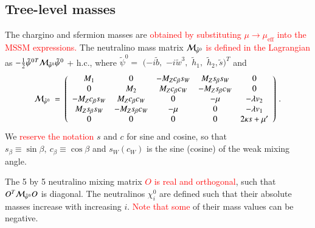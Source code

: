 \documentclass[final,3p,times,pdflatex]{elsarticle}
\newcommand{\ba}{\begin{eqnarray}}
\newcommand{\ea}{\end{eqnarray}}
\newcommand*{\red}[1]{\textcolor{red}{#1}}
\begin{document}
 

\subsection{Tree-level masses \label{sec:tree}}
The chargino and sfermion masses are \red{obtained by substituting $\mu\to\mu_\textrm{eff}$ into the MSSM expressions.} %
 The neutralino mass matrix \red{${\cal M}_{\tilde{\psi}^0}$} %
\red{is defined in the Lagrangian} %
 as
$-\frac{1}{2}
{\tilde\psi^0}{}^T{\cal M}_{\tilde\psi^0}\tilde\psi^0$ + h.c., where
$\tilde\psi^0 =$ $(-i\tilde b,$ $-i\tilde w^3,$ $\tilde h_1,$ $\tilde
h_2, \tilde{s})^T$ and
\begin{equation}
{\cal M}_{\tilde\psi^0} \ =\ \left(\begin{array}{ccccc} 
M_1 & 0 &-M_Zc_\beta s_W & M_Zs_\beta s_W & 0 \\
 0 & M_2 & M_Zc_\beta c_W & -M_Zs_\beta c_W & 0 \\ 
-M_Zc_\beta s_W & M_Zc_\beta c_W & 0 & -\mu & -\lambda v_2 \\
M_Zs_\beta s_W & -M_Zs_\beta c_W & -\mu & 0 & - \lambda v_1 \\
0 & 0 & 0 & 0 & 2 \kappa s + \mu^\prime
\end{array} \right)\,. \label{mchi0}
\end{equation} 
We \red{reserve the notation} %
 $s$ and $c$ for sine and cosine, so that
$s_\beta\equiv\sin\beta,\ c_{\beta}\equiv\cos\beta$ and $s_W (c_W)$ is
the sine (cosine) of the weak mixing angle.  

The 5 by 5 neutralino mixing matrix \red{$O$ is real and orthogonal}, %
  such that $O^T {\cal M}_{\tilde\psi^0} O$ is diagonal.
The neutralinos $\chi^0_i$ are defined such that their absolute masses
increase with increasing $i$. \red{Note that some} %
 of their mass values can be negative. 
\end{document}
